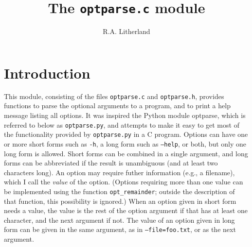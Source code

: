 \documentclass{article}
\renewcommand{\tt}{\texttt}
\begin{document}
\title{The \tt{optparse.c} module}
\author{R.A. Litherland}
\date{}
\maketitle

\section{Introduction}
This module, consisting of the files \tt{optparse.c} and
\tt{optparse.h},  provides functions to parse the optional
arguments to a program, and to print a help message listing all
options. It was inspired the Python module optparse, which is
referred to below as \tt{optparse.py}, and attempts to make it easy to
get most of the functionality provided by \tt{optparse.py} in a C
program. Options can have one 
or more short forms such as \tt{-h}, a long form such as
\tt{--help}, or both, but only one long form is allowed. Short
forms can be combined in a single argument, and long
forms can be abbreviated if the result is unambiguous (and at least
two characters long). An option may
require futher information (e.g., a filename), which I call the
\emph{value} of the option. (Options requiring more than one value can
be implemented using the function \tt{opt\_remainder}; outside the
description of that function, this possibility is ignored.) 
When an option given in short form needs a value, the
value is the rest of the option argument if that has at least one
character, and the next argument if not. The value of an option given
in long form can be given in the same argument, as in
\tt{--file=foo.txt}, or as the next argument. 
\end{document}

